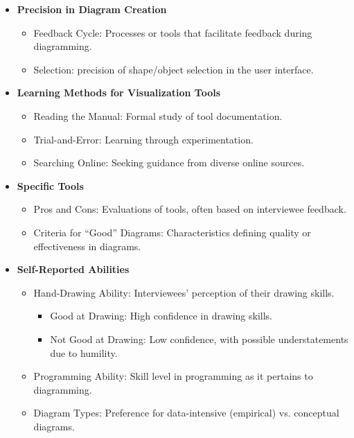 \begin{itemize}
    \item \textbf{Precision in Diagram Creation}
    \begin{itemize}
        \item Feedback Cycle: Processes or tools that facilitate feedback during diagramming.
        \item Selection: precision of shape/object selection in the user interface.
    \end{itemize}

    \item \textbf{Learning Methods for Visualization Tools}
    \begin{itemize}
        \item Reading the Manual: Formal study of tool documentation.
        \item Trial-and-Error: Learning through experimentation.
        \item Searching Online: Seeking guidance from diverse online sources.
    \end{itemize}

    \item \textbf{Specific Tools}
    \begin{itemize}
        \item Pros and Cons: Evaluations of tools, often based on interviewee feedback.
        \item Criteria for ``Good'' Diagrams: Characteristics defining quality or effectiveness in diagrams.
    \end{itemize}

    \item \textbf{Self-Reported Abilities}
    \begin{itemize}
        \item Hand-Drawing Ability: Interviewees’ perception of their drawing skills.
        \begin{itemize}
            \item Good at Drawing: High confidence in drawing skills.
            \item Not Good at Drawing: Low confidence, with possible understatements due to humility.
        \end{itemize}
        \item Programming Ability: Skill level in programming as it pertains to diagramming.
        \item Diagram Types: Preference for data-intensive (empirical) vs. conceptual diagrams.
    \end{itemize}


\end{itemize}
